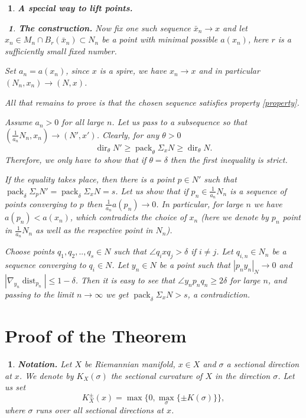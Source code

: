 \documentclass{article}
\def\cA{{\mathcal A}}
\def\cB{{\mathcal B}}
\def\ge{\geqslant}
\def\le{\leqslant}
\def\i{\subset}
\def\Const{\operatorname{Const}}
\def\dir{\operatorname{dir}}
\def\dist{\operatorname{dist}}
\def\pack{\operatorname{pack}}
\newtheorem{Nothing}[thm]{$\!\!\!$}
\newenvironment{nothing}{\begin{Nothing}\rm}{\end{Nothing}}
\begin{document}
\begin{nothing}{\bf A special way to lift points.}
\begin{nothing}{\bf The construction.}
Now fix one such sequence $\bar x_n\to x$ and let
$x_n\in M_n\cap B_r(\bar x_n)\i N_n$
be a point with minimal possible $a(x_n)$,
here $r$ is a sufficiently small fixed number.

Set $a_n=a(x_n)$, since $x$ is a spire, we have $x_n\to x$ and in particular $(N_n,x_n)\to (N,x)$.

All that remains to prove is that the chosen sequence satisfies property \ref{property}.

Assume $a_n>0$ for all large $n$.
Let us pass to a subsequence so that $(\frac1{a_n}N_n,x_n)\to (N', x')$.
Clearly, for any $\theta>0$
$$\dir_\theta N'\ge \pack_\theta \Sigma_x N\ge \dir_\theta N.$$
Therefore, we only have to show  that if $\theta=\delta$ then the first inequality is strict.

If the equality takes place, then there is a point $p\in  N'$ such that $\pack_\delta \Sigma_{p}N'=\pack_\delta \Sigma_x N=s$.
Let us show that if $p_n\in \frac1{a_n}N_n$ is a sequence of points converging to
$p$ then $\frac1{a_n}a(p_n)\to0$. In particular, for large $n$ we have $a(p_n)<a(x_n)$,
which contradicts the choice of $x_n$ (here we denote by $p_n$ point in $\frac1{a_n}N_n$
as well as the respective point in $N_n$).

Choose points $q_1,q_2,..,q_s\in N$ such that $\angle q_i x q_j>\delta$ if $i\not=j$.
Let $q_{i,n}\in N_n$ be a sequence converging to $q_i\in N$.
Let $y_n\in N$ be a point such that
$|p_n y_n|_N\to 0$ and $|\nabla_{y_n}\dist_{p_n}|\le 1-\delta$.
Then it is easy to see that $\angle y_n p_n q_n\ge 2\delta$ for large $n$,
and passing to the limit $n\to\infty$ we get $\pack_\delta \Sigma_x N>s$, a contradiction.
\end{nothing}
\end{nothing}


\section{Proof of the Theorem}

\begin{nothing}{\bf Notation.}
 Let $X$ be Riemannian manifold, $x\in X$ and $\sigma$ a sectional direction at $x$.
We denote by $K_X(\sigma)$ the sectional curvature of $X$ in the direction $\sigma$.
Let us set
$$K^\pm_X(x)=\max\{0,\max_\sigma\{\pm K(\sigma)\}\},$$
where $\sigma$ runs over all sectional directions at $x$.



\end{nothing}
\end{document}
